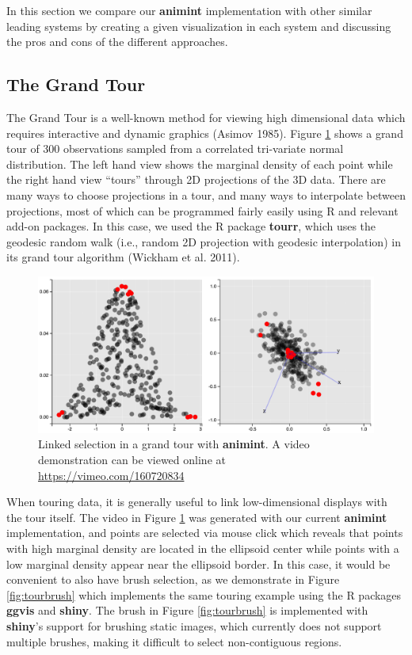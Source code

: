 \documentclass[12pt,]{article}
\theoremstyle{definition}
\theoremstyle{definition}
\theoremstyle{definition}
\theoremstyle{remark}
\begin{document}
In this section we compare our \textbf{animint} implementation with
other similar leading systems by creating a given visualization in each
system and discussing the pros and cons of the different approaches.

\hypertarget{tour}{%
\subsection{The Grand Tour}\label{tour}}

The Grand Tour is a well-known method for viewing high dimensional data
which requires interactive and dynamic graphics (Asimov 1985). Figure
\ref{fig:tour} shows a grand tour of 300 observations sampled from a
correlated tri-variate normal distribution. The left hand view shows the
marginal density of each point while the right hand view ``tours''
through 2D projections of the 3D data. There are many ways to choose
projections in a tour, and many ways to interpolate between projections,
most of which can be programmed fairly easily using R and relevant
add-on packages. In this case, we used the R package \textbf{tourr},
which uses the geodesic random walk (i.e., random 2D projection with
geodesic interpolation) in its grand tour algorithm (Wickham et al.
2011).

\begin{figure}
\centering
\includegraphics{images/tour}
\caption{\label{fig:tour}Linked selection in a grand tour with
\textbf{animint}. A video demonstration can be viewed online at
\url{https://vimeo.com/160720834}}
\end{figure}

When touring data, it is generally useful to link low-dimensional
displays with the tour itself. The video in Figure \ref{fig:tour} was
generated with our current \textbf{animint} implementation, and points
are selected via mouse click which reveals that points with high
marginal density are located in the ellipsoid center while points with a
low marginal density appear near the ellipsoid border. In this case, it
would be convenient to also have brush selection, as we demonstrate in
Figure \ref{fig:tourbrush} which implements the same touring example
using the R packages \textbf{ggvis} and \textbf{shiny}. The brush in
Figure \ref{fig:tourbrush} is implemented with \textbf{shiny}'s support
for brushing static images, which currently does not support multiple
brushes, making it difficult to select non-contiguous regions.
\end{document}
